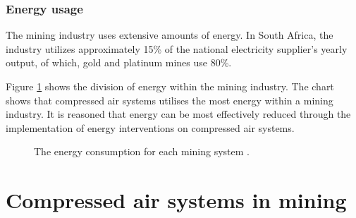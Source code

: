 		\subsubsection{Energy usage}
			The mining industry uses extensive amounts of energy. In South Africa, the industry utilizes approximately 15\% of the national electricity supplier's yearly output, of which, gold and platinum mines use 80\%.\cite{Eskom2010Energy}
			\par
			Figure \ref{fig: Energy Split} shows the division of energy within the mining industry. The chart shows that compressed air systems utilises the most energy within a mining industry. It is reasoned that energy can be most effectively reduced through the implementation of energy interventions on compressed air systems.
			\begin{figure}[h]
				\centering
				\caption[The energy consumption for each mining system.]{The energy consumption for each mining system \cite{le2005energy}.}
				\label{fig: Energy Split}
			\end{figure}
\section{Compressed air systems in mining}
